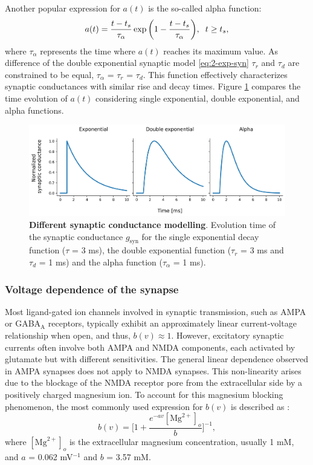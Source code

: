 \documentclass[../main.tex]{subfiles}
\begin{document}
Another popular expression for $a(t)$ is the so-called alpha function: 
\begin{equation}
    a(t) = \displaystyle\frac{t-t_s}{\tau_\alpha}\exp{\bigg(1-\displaystyle\frac{t-t_s}{\tau_\alpha}\bigg)}, \hspace{2mm} t \ge t_s,
    \label{eq:alpha-syn}
\end{equation}
where $\tau_\alpha$ represents the time where $a(t)$ reaches its maximum value. 
As difference of the double exponential synaptic model \eqref{eq:2-exp-syn} $\tau_r$ and $\tau_d$ are constrained to be equal, $\tau_\alpha$ = $\tau_r$ = $\tau_d$. 
This function effectively characterizes synaptic conductances with similar rise and decay times.
Figure \ref{fig:a-functions} compares the time evolution of $a(t)$ considering single exponential, double exponential, and alpha functions.
\begin{figure}[!htb]
    \centering
    \includegraphics[width=\textwidth]{chapter1/figures/synaptic_conductances.png}
    \caption{\textbf{Different synaptic conductance modelling}.
    Evolution time of the synaptic conductance $g_\text{syn}$ for the single exponential decay function ($\tau$ = 3 ms), the double exponential function ($\tau_r$ = 3 ms and $\tau_d$ = 1 ms) and the alpha function ($\tau_\alpha$ = 1 ms).}
    \label{fig:a-functions}
\end{figure}
\subsubsection{Voltage dependence of the synapse}
Most ligand-gated ion channels involved in synaptic transmission, such as AMPA or GABA$_\text{A}$ receptors, typically exhibit an approximately linear current-voltage relationship when open, and thus, $b(v) \approx 1$. 
However, excitatory synaptic currents often involve both AMPA and NMDA components, each activated by glutamate but with different sensitivities.
The general linear dependence observed in AMPA synapses does not apply to NMDA synapses. 
This non-linearity arises due to the blockage of the NMDA receptor pore from the extracellular side by a positively charged magnesium ion.
To account for this magnesium blocking phenomenon, the most commonly used expression for $b(v)$ is described as \cite{jahr_voltage_1990}:
\begin{equation}
    b(v) = \Bigg[1 + \displaystyle\frac{e^{-av}[\text{Mg}^{2+}]_o}{b}\Bigg]^{-1},
    \label{eq:mgblock-syn}
\end{equation}
where $[\text{Mg}^{2+}]_o$ is the extracellular magnesium concentration, usually 1 mM, and $a$ = 0.062 mV$^{-1}$ and $b$ = 3.57 mM. 
\end{document}
